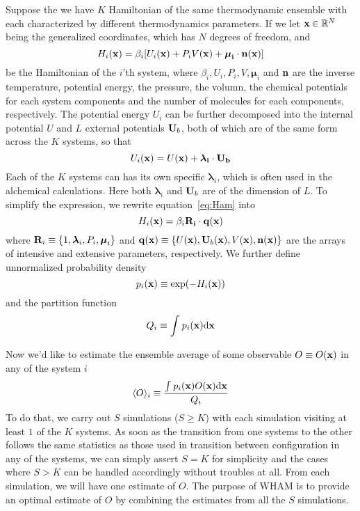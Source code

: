 Suppose the we have $K$ Hamiltonian of the same thermodynamic ensemble with
each characterized by different thermodynamics parameters. If we let $\mathbf{x} \in
 \mathbb{R}^{N}$ being the generalized coordinates, which has $N$  degrees of 
 freedom, and
\begin{equation}\label{eq:Ham}
H_{i}(\mathbf{x}) = \beta_{i}[ U_{i}(\mathbf{x}) + P_{i}V(\mathbf{x}) + \mathbf{\boldsymbol\mu_{i}}\cdot\mathbf{\mathbf{n}(\mathbf{x})}]
\end{equation}
be the Hamiltonian of the $i$'th system, where $\beta_{i}, U_{i}, P_{i}, V, \boldsymbol\mu_{i}$
and $\mathbf{n}$ are the inverse temperature, potential energy, the pressure, the volumn, the chemical
potentials for each system components and the number of molecules for each components, 
respectively. The potential energy $U_{i}$ can be further decomposed into 
the internal potential $U$ and $L$ external potentials $\mathbf{U}_{b}$, both 
of which are of the same form across the $K$ systems, so that 
\begin{equation}\label{eq:Pot}
U_{i}(\mathbf{x}) = U(\mathbf{x}) + \mathbf{\boldsymbol\lambda_{i}}\cdot\mathbf{\mathbf{U}_{b}}
\end{equation} 
Each of the $K$ systems can has its own specific $\boldsymbol\lambda_{i}$,  
which is often used in the alchemical calculations. Here both $\boldsymbol\lambda_{i}$ 
and $\mathbf{U}_{b}$ are of the dimension of $L$. To simplify the expression, 
we rewrite equation~\ref{eq:Ham} into
\begin{equation}\label{eq:simHam}
H_{i}(\mathbf{x}) = \beta_{i}\mathbf{\mathbf{R}_{i}}\cdot\mathbf{\mathbf{q}(\mathbf{x})}
\end{equation}
where $\mathbf{R}_{i} \equiv \{1, \boldsymbol\lambda_{i}, P_{i}, \boldsymbol\mu_{i}\}$
and $\mathbf{q}(\mathbf{x}) \equiv \{U(\mathbf{x}), \mathbf{U}_{b}(\mathbf{x}), V(\mathbf{x}), \mathbf{n}(\mathbf{x})\}$
are the arrays of intensive and extensive parameters, respectively. 
We further define unnormalized probability density 
\begin{equation}
p_{i}(\mathbf{x}) \equiv \exp(-H_{i}(\mathbf{x}))
\end{equation}
and the partition function
\begin{equation}
Q_{i} \equiv \int_{}^{}{p_{i}}(\mathbf{x})\mathrm{d}\mathbf{x} 
\end{equation}

Now we'd like to estimate the ensemble average of some observable 
$O \equiv O(\mathbf{x})$ in any of the system $i$
\begin{equation}
\langle O \rangle_{i} \equiv \frac{\int_{}^{}{p_{i}(\mathbf{x})O}(\mathbf{x})\mathrm{d}\mathbf{x}}{Q_{i}}
\end{equation}
To do that, we carry out $S$ simulations ($S \ge K$) with each 
simulation visiting at least $1$ of the $K$ systems. As soon as the transition 
from one systems to the other follows the same statistics as those used 
in transition between configuration in any of the systems, we can simply 
assert $S = K$ for simplicity and the cases where $S > K$ can be handled 
accordingly without troubles at all. From each simulation, we will have one 
estimate of $O$. The purpose of WHAM is to provide an optimal estimate of 
$O$ by combining the estimates from all the $S$ simulations.
